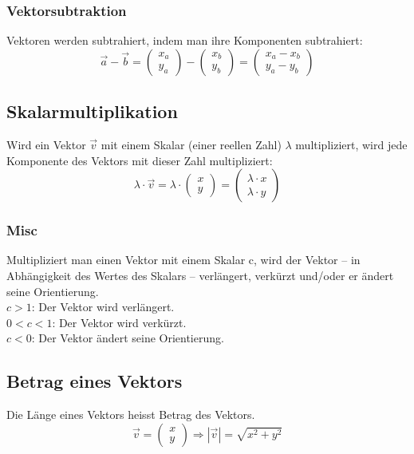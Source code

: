 \begin{multicols}{3}
\subsubsection*{Vektorsubtraktion}
Vektoren werden subtrahiert, indem man ihre Komponenten subtrahiert:
\begin{equation*}
    \vec{a}-\vec{b} = \begin{pmatrix} x_a \\ y_a\end{pmatrix}-\begin{pmatrix} x_b \\ y_b\end{pmatrix} = \begin{pmatrix} x_a-x_b \\ y_a-y_b\end{pmatrix}
\end{equation*}

\subsection*{Skalar­multiplikation}
Wird ein Vektor $\vec{v}$ mit einem Skalar (einer reellen Zahl) $\lambda$ multipliziert, wird jede Komponente des Vektors mit dieser Zahl multipliziert:
\begin{equation*}
    \lambda \cdot \vec{v} = \lambda \cdot \begin{pmatrix} x \\ y \end{pmatrix} = \begin{pmatrix} \lambda \cdot x \\ \lambda \cdot y \end{pmatrix}
\end{equation*}
\subsubsection*{Misc}
Multipliziert man einen Vektor mit einem Skalar c, wird der Vektor – in Abhängigkeit des Wertes des Skalars – verlängert, verkürzt und/oder er ändert seine Orientierung.\\
$c > 1$: Der Vektor wird verlängert.\\
$0 < c < 1$: Der Vektor wird verkürzt.\\
$c < 0$: Der Vektor ändert seine Orientierung.\\

\subsection*{Betrag eines Vektors}
Die Länge eines Vektors heisst Betrag des Vektors.
\begin{equation*}
    \vec{v}= \begin{pmatrix} x \\ y \end{pmatrix} \Rightarrow \left|\vec{v}\right| = \sqrt{x^2 + y^2}
\end{equation*}


\end{multicols}
